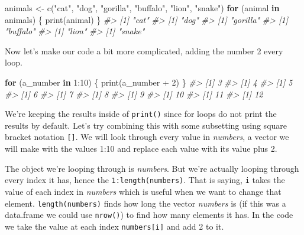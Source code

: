 \documentclass[
]{krantz}
\makeatletter
\newenvironment{Shaded}{\begin{snugshade}}{\end{snugshade}}
\newcommand{\CommentTok}[1]{\textcolor[rgb]{0.37,0.37,0.37}{\textit{#1}}}
\newcommand{\ControlFlowTok}[1]{\textcolor[rgb]{0.27,0.27,0.27}{\textbf{#1}}}
\newcommand{\DecValTok}[1]{\textcolor[rgb]{0.06,0.06,0.06}{#1}}
\newcommand{\FunctionTok}[1]{\textcolor[rgb]{0,0,0}{#1}}
\newcommand{\NormalTok}[1]{#1}
\newcommand{\OtherTok}[1]{\textcolor[rgb]{0.37,0.37,0.37}{#1}}
\newcommand{\SpecialCharTok}[1]{\textcolor[rgb]{0,0,0}{#1}}
\newcommand{\StringTok}[1]{\textcolor[rgb]{0.5,0.5,0.5}{#1}}
\newenvironment{kframe}{%
\medskip{}
\setlength{\fboxsep}{.8em}
 \def\at@end@of@kframe{}%
 \ifinner\ifhmode%
  \def\at@end@of@kframe{\end{minipage}}%
  \begin{minipage}{\columnwidth}%
 \fi\fi%
 \def\FrameCommand##1{\hskip\@totalleftmargin \hskip-\fboxsep
 \colorbox{shadecolor}{##1}\hskip-\fboxsep
     \hskip-\linewidth \hskip-\@totalleftmargin \hskip\columnwidth}%
 \MakeFramed {\advance\hsize-\width
   \@totalleftmargin\z@ \linewidth\hsize
   \@setminipage}}%
 {\par\unskip\endMakeFramed%
 \at@end@of@kframe}
\renewenvironment{Shaded}{\begin{kframe}}{\end{kframe}}
\makeatother
\begin{document}
\begin{Shaded}
\begin{Highlighting}[]
\NormalTok{animals }\OtherTok{\textless{}{-}} \FunctionTok{c}\NormalTok{(}\StringTok{"cat"}\NormalTok{, }\StringTok{"dog"}\NormalTok{, }\StringTok{"gorilla"}\NormalTok{, }\StringTok{"buffalo"}\NormalTok{, }\StringTok{"lion"}\NormalTok{, }\StringTok{"snake"}\NormalTok{)}
\ControlFlowTok{for}\NormalTok{ (animal }\ControlFlowTok{in}\NormalTok{ animals) \{}
  \FunctionTok{print}\NormalTok{(animal)}
\NormalTok{\}}
\CommentTok{\#\textgreater{} [1] "cat"}
\CommentTok{\#\textgreater{} [1] "dog"}
\CommentTok{\#\textgreater{} [1] "gorilla"}
\CommentTok{\#\textgreater{} [1] "buffalo"}
\CommentTok{\#\textgreater{} [1] "lion"}
\CommentTok{\#\textgreater{} [1] "snake"}
\end{Highlighting}
\end{Shaded}

Now let's make our code a bit more complicated, adding the
number 2 every loop.

\begin{Shaded}
\begin{Highlighting}[]
\ControlFlowTok{for}\NormalTok{ (a\_number }\ControlFlowTok{in} \DecValTok{1}\SpecialCharTok{:}\DecValTok{10}\NormalTok{) \{}
  \FunctionTok{print}\NormalTok{(a\_number }\SpecialCharTok{+} \DecValTok{2}\NormalTok{)}
\NormalTok{\}}
\CommentTok{\#\textgreater{} [1] 3}
\CommentTok{\#\textgreater{} [1] 4}
\CommentTok{\#\textgreater{} [1] 5}
\CommentTok{\#\textgreater{} [1] 6}
\CommentTok{\#\textgreater{} [1] 7}
\CommentTok{\#\textgreater{} [1] 8}
\CommentTok{\#\textgreater{} [1] 9}
\CommentTok{\#\textgreater{} [1] 10}
\CommentTok{\#\textgreater{} [1] 11}
\CommentTok{\#\textgreater{} [1] 12}
\end{Highlighting}
\end{Shaded}

We're keeping the results inside of \texttt{print()} since
for loops do not print the results by default. Let's try
combining this with some subsetting using square bracket
notation \texttt{{[}{]}}. We will look through every value
in \emph{numbers}, a vector we will make with the values
1:10 and replace each value with its value plus 2.

The object we're looping through is \emph{numbers}. But
we're actually looping through every index it has, hence the
\texttt{1:length(numbers)}. That is saying, \texttt{i} takes
the value of each index in \emph{numbers} which is useful
when we want to change that element.
\texttt{length(numbers)} finds how long the vector
\emph{numbers} is (if this was a data.frame we could use
\texttt{nrow()}) to find how many elements it has. In the
code we take the value at each index \texttt{numbers{[}i{]}}
and add 2 to it.
\end{document}

